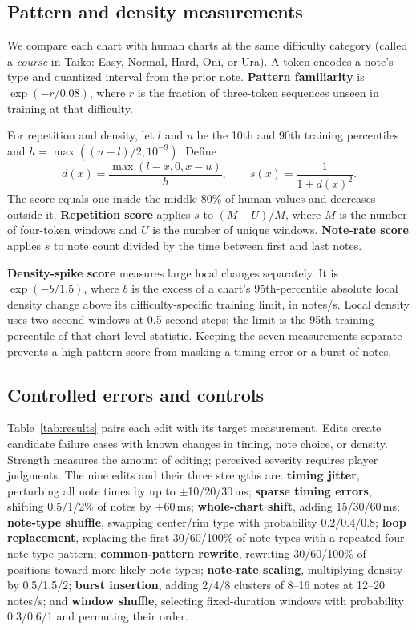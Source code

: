 \documentclass[letterpaper]{article}
\begin{document}
\subsection{Pattern and density measurements}
We compare each chart with human charts at the same difficulty category
(called a \emph{course} in Taiko: Easy, Normal, Hard, Oni, or Ura). A token
encodes a note's type and quantized interval from the prior note.
\textbf{Pattern familiarity} is $\exp(-r/0.08)$, where $r$ is the fraction
of three-token sequences unseen in training at that difficulty.

For repetition and density, let $l$ and $u$ be the 10th and 90th training
percentiles and $h=\max((u-l)/2,10^{-9})$. Define
\begin{equation}
 d(x)=\frac{\max(l-x,0,x-u)}{h},\qquad s(x)=\frac{1}{1+d(x)^2}.
 \label{eq:range}
\end{equation}
The score equals one inside the middle 80\% of human values and decreases
outside it. \textbf{Repetition score} applies $s$ to $(M-U)/M$, where $M$
is the number of four-token windows and $U$ is the number of unique windows.
\textbf{Note-rate score} applies $s$ to note count divided by the time
between first and last notes.

\textbf{Density-spike score} measures large local changes separately.
It is $\exp(-b/1.5)$, where $b$ is the excess of a chart's 95th-percentile
absolute local density change above its difficulty-specific training limit, in
notes/s. Local density uses two-second windows at 0.5-second steps; the
limit is the 95th training percentile of that chart-level statistic.
Keeping the seven measurements separate prevents a high pattern score from
masking a timing error or a burst of notes.

\subsection{Controlled errors and controls}
\label{sec:edits}
Table~\ref{tab:results} pairs each edit with its target measurement. Edits
create candidate failure cases with known changes in timing, note choice,
or density. Strength measures the amount of editing; perceived severity
requires player judgments. The nine edits and their three strengths are:
\textbf{timing jitter}, perturbing all note times by up to
$\pm$10/20/30\,ms; \textbf{sparse timing errors}, shifting 0.5/1/2\% of
notes by $\pm$60\,ms; \textbf{whole-chart shift}, adding 15/30/60\,ms;
\textbf{note-type shuffle}, swapping center/rim type with probability
0.2/0.4/0.8;
\textbf{loop replacement}, replacing the first 30/60/100\% of note types with a repeated
four-note-type pattern; \textbf{common-pattern rewrite}, rewriting
30/60/100\% of positions toward more likely note types;
\textbf{note-rate scaling}, multiplying density by 0.5/1.5/2;
\textbf{burst insertion}, adding 2/4/8 clusters of 8--16 notes at
12--20 notes/s; and
\textbf{window shuffle}, selecting fixed-duration windows with probability
0.3/0.6/1 and permuting their order.
\end{document}
